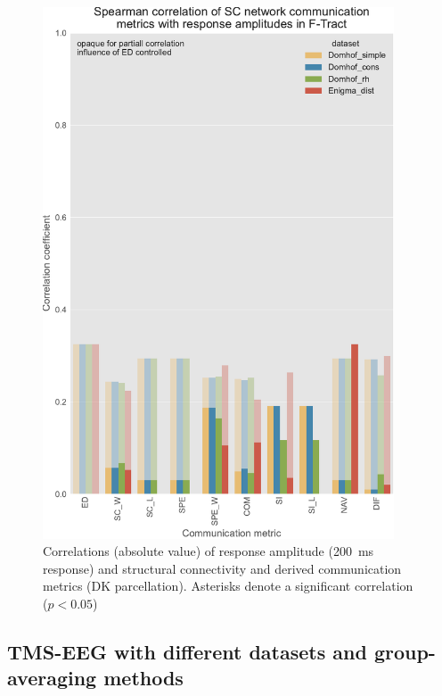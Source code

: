 \begin{figure}
    \centering
    \includegraphics[width=0.93\textwidth]{images/nootebook_generated/ftract_results/DKT/5/ED0/0.25/long/Spearman_correlation_of_SC_network_communication_metrics_with_response_amplitudes_in_F-Tract.pdf}
    \caption[F-TRACT amplitude correlations - all $SC$ matrices (DK)]{Correlations (absolute value) of response amplitude (200~ms response) and structural connectivity and derived communication metrics (DK parcellation). Asterisks denote a significant correlation ($p<0.05$)}
    \label{fig:ftract_alldata_long_amplitudes_DK}
\end{figure}

\subsection{TMS-EEG with different datasets and group-averaging methods}


